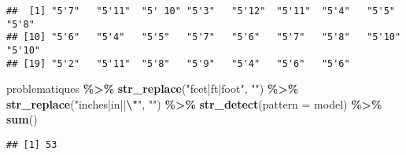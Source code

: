 \documentclass[
]{article}
\newenvironment{Shaded}{\begin{snugshade}}{\end{snugshade}}
\newcommand{\AttributeTok}[1]{\textcolor[rgb]{0.13,0.29,0.53}{#1}}
\newcommand{\CommentTok}[1]{\textcolor[rgb]{0.56,0.35,0.01}{\textit{#1}}}
\newcommand{\FunctionTok}[1]{\textcolor[rgb]{0.13,0.29,0.53}{\textbf{#1}}}
\newcommand{\NormalTok}[1]{#1}
\newcommand{\OtherTok}[1]{\textcolor[rgb]{0.56,0.35,0.01}{#1}}
\newcommand{\SpecialCharTok}[1]{\textcolor[rgb]{0.81,0.36,0.00}{\textbf{#1}}}
\newcommand{\StringTok}[1]{\textcolor[rgb]{0.31,0.60,0.02}{#1}}
\begin{document}
\begin{Shaded}
\end{Shaded}

\begin{verbatim}
##  [1] "5'7"   "5'11"  "5' 10" "5'3"   "5'12"  "5'11"  "5'4"   "5'5"   "5'8"  
## [10] "5'6"   "5'4"   "5'5"   "5'7"   "5'6"   "5'7"   "5'8"   "5'10"  "5'10" 
## [19] "5'2"   "5'11"  "5'8"   "5'9"   "5'4"   "5'6"   "5'6"
\end{verbatim}

\begin{Shaded}
\end{Shaded}

\begin{Shaded}
\begin{Highlighting}[]
\NormalTok{problematiques }\SpecialCharTok{\%\textgreater{}\%} \FunctionTok{str\_replace}\NormalTok{(}\StringTok{"feet|ft|foot"}\NormalTok{, }\StringTok{"\textquotesingle{}"}\NormalTok{) }\SpecialCharTok{\%\textgreater{}\%} 
  \FunctionTok{str\_replace}\NormalTok{(}\StringTok{"inches|in|\textquotesingle{}\textquotesingle{}|}\SpecialCharTok{\textbackslash{}"}\StringTok{"}\NormalTok{, }\StringTok{""}\NormalTok{) }\SpecialCharTok{\%\textgreater{}\%} 
  \FunctionTok{str\_detect}\NormalTok{(}\AttributeTok{pattern =}\NormalTok{ model) }\SpecialCharTok{\%\textgreater{}\%} \FunctionTok{sum}\NormalTok{()}
\end{Highlighting}
\end{Shaded}

\begin{verbatim}
## [1] 53
\end{verbatim}
\end{document}
